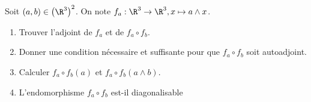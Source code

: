 \begin{enonce}
\begin{exercise}[ID={RMS124 E919 centrale PSI},subtitle={},tags={}]
  Soit $(a,b)\in\left( \R^3 \right)^2$.
  On note $f_a : \R^3 \to\R^3, x\mapsto a\wedge x$.
\begin{enumerate}
  \item Trouver l'adjoint de $f_a$ et de $f_a\circ f_b$.
  \item Donner une condition nécessaire et suffisante pour que $f_a\circ f_b$ soit autoadjoint.
  \item Calculer $f_a\circ f_b(a)$ et $f_a\circ f_b\left( a \wedge b \right)$.
  \item L'endomorphisme $f_a\circ f_b$ est-il diagonalisable
\end{enumerate}
\end{exercise}
\begin{solution}
\end{solution}
\end{enonce}
